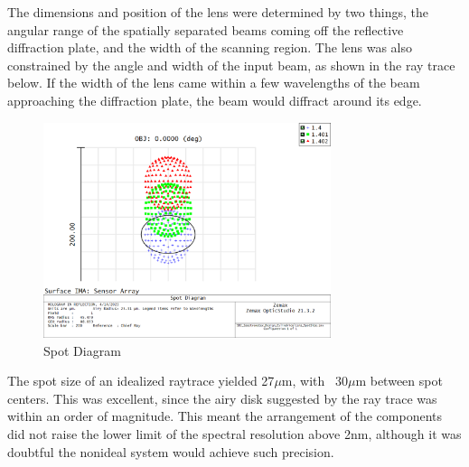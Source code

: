 The dimensions and position of the lens were determined by two things, the angular range of the spatially separated beams coming off the reflective diffraction plate, and the width of the scanning region. The lens was also constrained by the angle and width of the input beam, as shown in the ray trace below. If the width of the lens came within a few wavelengths of the beam approaching the diffraction plate, the beam would diffract around its edge.

\begin{figure}[H]
    \caption{Spot Diagram}
    \centering
    \includegraphics[width=0.75\textwidth]{images/SpotDiagram.png}
\end{figure}

The spot size of an idealized raytrace yielded 27$\mu$m, with ~30$\mu$m between spot centers. This was excellent, since the airy disk suggested by the ray trace was within an order of magnitude. This meant the arrangement of the components did not raise the lower limit of the spectral resolution above 2nm, although it was doubtful the nonideal system would achieve such precision.

